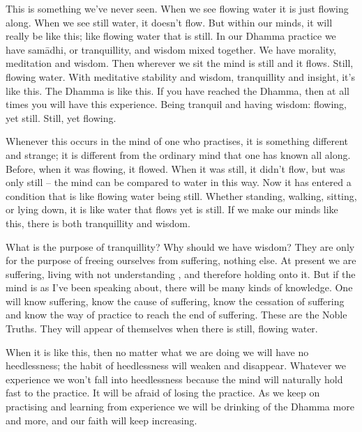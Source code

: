 This is something we've never seen. When we see flowing water it is just flowing along. When we see still water, it doesn't flow. But within our minds, it will really be like this; like flowing water that is still. In our Dhamma practice we have sam\=adhi, or tranquillity, and wisdom mixed together. We have morality, meditation and wisdom. Then wherever we sit the mind is still and it flows. Still, flowing water. With meditative stability and wisdom, tranquillity and insight, it's like this. The Dhamma is like this. If you have reached the Dhamma, then at all times you will have this experience. Being tranquil and having wisdom: flowing, yet still. Still, yet flowing. 

Whenever this occurs in the mind of one who practises, it is something different and strange; it is different from the ordinary mind that one has known all along. Before, when it was flowing, it flowed. When it was still, it didn't flow, but was only still -- the mind can be compared to water in this way. Now it has entered a condition that is like flowing water being still. Whether standing, walking, sitting, or lying down, it is like water that flows yet is still. If we make our minds like this, there is both tranquillity and wisdom. 

What is the purpose of tranquillity? Why should we have wisdom? They are only for the purpose of freeing ourselves from suffering, nothing else. At present we are suffering, living with  not understanding , and therefore holding onto it. But if the mind is as I've been speaking about, there will be many kinds of knowledge. One will know suffering, know the cause of suffering, know the cessation of suffering and know the way of practice to reach the end of suffering. These are the Noble Truths. They will appear of themselves when there is still, flowing water. 

When it is like this, then no matter what we are doing we will have no heedlessness; the habit of heedlessness will weaken and disappear. Whatever we experience we won't fall into heedlessness because the mind will naturally hold fast to the practice. It will be afraid of losing the practice. As we keep on practising and learning from experience we will be drinking of the Dhamma more and more, and our faith will keep increasing. 

